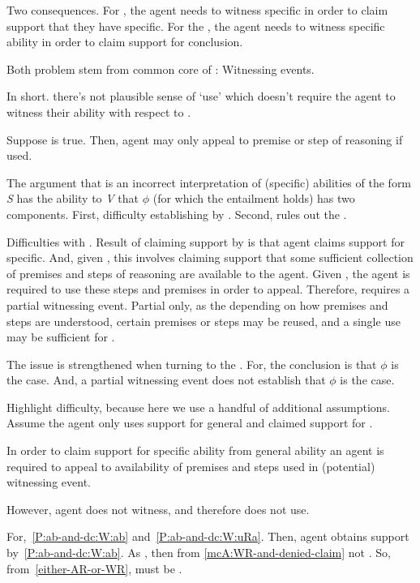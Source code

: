 \begin{note}[Proposition]
{    Two consequences.
    For \gsi{}, the agent needs to witness specific in order to claim support that they have specific.
    For the \aben{}, the agent needs to witness specific ability in order to claim support for conclusion.

    Both problem stem from common core of \WR{}: Witnessing events.

    In short. there's not plausible sense of `use' which doesn't require the agent to witness their ability with respect to \WR{}.
  }

  Suppose \ESU{} is true.
  Then, agent may only appeal to premise or step of reasoning if used.

  The argument that \WR{} is an incorrect interpretation of (specific) abilities of the form \emph{S} has the ability to \emph{V} that \(\phi\) (for which the \aben{} entailment holds) has two components.
  First, difficulty establishing by \gsi{}.
  Second, rules out the \aben{}.

  Difficulties with \gsi{}.
  Result of claiming support by \gsi{} is that agent claims support for specific.
  And, given \WR{}, this involves claiming support that some sufficient collection of premises and steps of reasoning are available to the agent.
  Given \ESU{}, the agent is required to use these steps and premises in order to appeal.
  Therefore, \ESU{} requires a partial witnessing event.
  Partial only, as the depending on how premises and steps are understood, certain premises or steps may be reused, and a single use may be sufficient for \ESU{}.

  The issue is strengthened when turning to the \aben{}.
  For, the conclusion is that \(\phi\) is the case.
  And, a partial witnessing event does not establish that \(\phi\) is the case.





  Highlight difficulty, because here we use a handful of additional assumptions.
  Assume the agent only uses support for general and claimed support for \gsi{}.
  


  In order to claim support for specific ability from general ability an agent is required to appeal to availability of premises and steps used in (potential) witnessing event.
  

  However, agent does not witness, and therefore does not use.
  



  For,~\ref{P:ab-and-dc:W:ab} and~\ref{P:ab-and-dc:W:uRa}.
  Then, agent obtains support by~\ref{P:ab-and-dc:W:ab}.
  As \ESU{}, then from \ref{mcA:WR-and-denied-claim} not \WR{}.
  So, from~\ref{either-AR-or-WR}, must be \AR{}.
\end{note}

